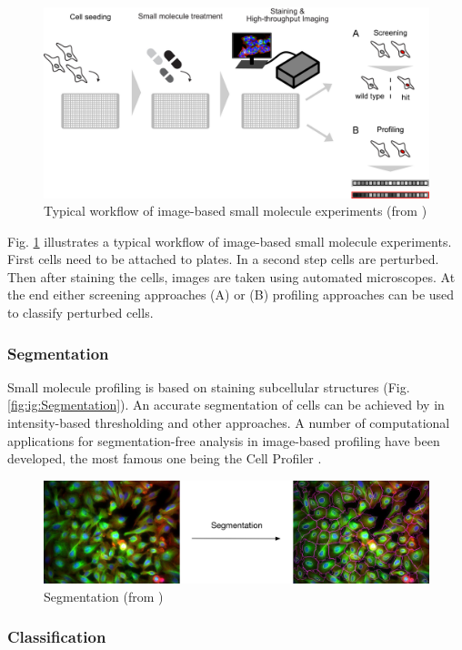 \begin{figure}[H]
	\centering
	\includegraphics[width=0.8\linewidth]{bilder/cells/hcu.png}
	\caption{Typical workflow of image-based small molecule experiments (from \cite{Scheeder2018})}
	\label{fig:Workflow}
\end{figure}

Fig. \ref{fig:Workflow} illustrates a typical workflow of image-based small molecule experiments. First cells need to be attached to plates. In a second step cells are perturbed. Then after staining the cells, images are taken using automated microscopes. At the end either screening approaches (A) or (B) profiling approaches can be used to classify perturbed cells.

\subsubsection{Segmentation}

Small molecule profiling is based on staining subcellular structures (Fig. \ref{fig:ig:Segmentation}).
An accurate segmentation of cells can be achieved by in intensity-based thresholding and other approaches. A number of computational applications for segmentation-free analysis in image-based profiling have been developed, the most famous one being the Cell Profiler \cite{CellProfiler}.


\begin{figure}[H]
	\centering
	\includegraphics[width=0.8\linewidth]{bilder/cells/segmentation.png}
	\caption{Segmentation (from \cite{Pau})}
	\label{fig:Segmentation}
\end{figure}


\subsubsection{Classification}


